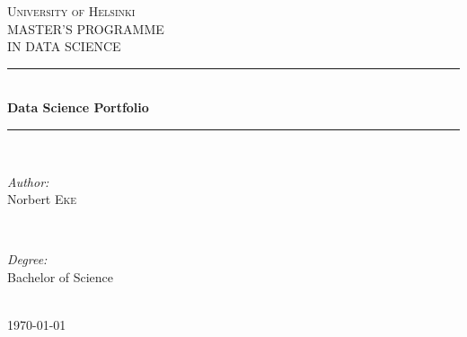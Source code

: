 \documentclass[12pt]{article} %
\begin{document}

\begin{titlepage}

\newcommand{\HRule}{\rule{\linewidth}{0.5mm}} %

\center %

\textsc{\LARGE University of Helsinki}\\[1.5cm] %
\textsc{\Large MASTER'S PROGRAMME}\\[0.5cm] %
\textsc{\large IN DATA SCIENCE}\\[0.5cm] %

\HRule \\[0.4cm]
{ \huge \bfseries Data Science Portfolio}\\[0.4cm] %
\HRule \\[1.5cm]

\begin{minipage}{0.4\textwidth}
\begin{flushleft} \large
\emph{Author:}\\
\large Norbert \textsc{Eke} %
\end{flushleft}
\end{minipage}
~
\begin{minipage}{0.4\textwidth}
\begin{flushright} \large
\emph{Degree:} \\
\large Bachelor of Science %
\end{flushright}
\end{minipage}\\[3cm]

{\large \today}\\[3cm] %


\vfill %

\end{titlepage}

\end{document}
